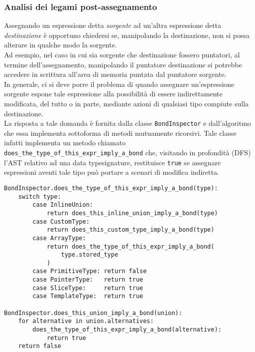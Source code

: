 \subsubsection{Analisi dei legami post-assegnamento}
Assegnando un espressione detta \textit{sorgente} ad un'altra espressione detta \textit{destinazione}
è opportuno chiedersi se, manipolando la destinazione, non si possa alterare in qualche modo la sorgente. \\

Ad esempio, nel caso in cui sia sorgente che destinazione fossero puntatori, al termine dell'assegnamento, 
manipolando il puntatore destinazione si potrebbe accedere in scrittura all'area di memoria puntata 
dal puntatore sorgente. \\

In generale, ci si deve porre il problema di quando assegnare un'espressione sorgente espone 
tale espressione alla possibilità di essere indirettamente modificata, del tutto o in parte, 
mediante azioni di qualsiasi tipo compiute sulla destinazione. \\

La risposta a tale domanda è fornita dalla classe \texttt{BondInspector} e dall'algoritmo che 
essa implementa sottoforma di metodi mutuamente ricorsivi. Tale classe infatti implementa un 
metodo chiamato \texttt{does\_the\_type\_of\_this\_expr\_imply\_a\_bond} che, visitando 
in profondità (DFS) l'AST relativo ad una data typesignature, restituisce \texttt{true} se 
assegnare espressioni aventi tale tipo può portare a scenari di modifica indiretta. \\

\vspace{0.5cm}
\begin{lstlisting}[frame=single]
BondInspector.does_the_type_of_this_expr_imply_a_bond(type):
    switch type:
        case InlineUnion:   
            return does_this_inline_union_imply_a_bond(type)
        case CustomType:    
            return does_this_custom_type_imply_a_bond(type)
        case ArrayType:     
            return does_the_type_of_this_expr_imply_a_bond(
                type.stored_type
            )
        case PrimitiveType: return false
        case PointerType:   return true
        case SliceType:     return true
        case TemplateType:  return true
    
BondInspector.does_this_union_imply_a_bond(union):
    for alternative in union.alternatives:
        does_the_type_of_this_expr_imply_a_bond(alternative):
            return true
    return false
\end{lstlisting}
\vspace{0.5cm}
